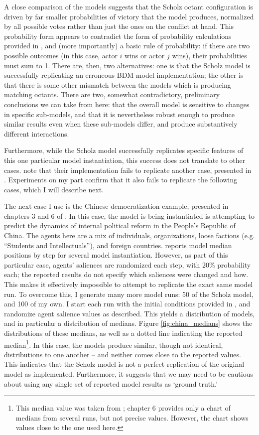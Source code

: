A close comparison of the models suggests that the Scholz octant configuration is driven by far smaller probabilities of victory that the model produces, normalized by all possible votes rather than just the ones on the conflict at hand. This probability form appears to contradict the form of probability calculations provided in \citet{bdm_1997,bdm_2002}, and (more importantly) a basic rule of probability: if there are two possible outcomes (in this case, actor $i$ wins or actor $j$ wins), their probabilities must sum to 1. There are, then, two alternatives: one is that the Scholz model is successfully replicating an erroneous BDM model implementation; the other is that there is some other mismatch between the models which is producing matching octants. There are two, somewhat contradictory, preliminary conclusions we can take from here: that the overall model is sensitive to changes in specific sub-models, and that it is nevertheless robust enough to produce similar results even when these sub-models differ, and produce substantively different interactions.

Furthermore, while the Scholz model successfully replicates specific features of this one particular model instantiation, this success does not translate to other cases. \citet{scholz_2011} note that their implementation fails to replicate another case, presented in \citet{bdm_1997}. Experiments on my part confirm that it also fails to replicate the following cases, which I will describe next.

The next case I use is the Chinese democratization example, presented in chapters 3 and 6 of \citet{bdm_2002}. In this case, the model is being instantiated is attempting to predict the dynamics of internal political reform in the People's Republic of China. The agents here are a mix of individuals, organizations, loose factions (e.g. ``Students and Intellectuals''), and foreign countries. \citet{bdm_2002} reports model median positions by step for several model instantiation. However, as part of this particular case, agents' saliences are randomized each step, with 20\% probability each; the reported results do not specify which saliences were changed and how. This makes it effectively impossible to attempt to replicate the exact same model run. To overcome this, I generate many more model runs: 50 of the Scholz model, and 100 of my own. I start each run with the initial conditions provided in \citet{bdm_2002}, and randomize agent salience values as described. This yields a distribution of models, and in particular a distribution of medians. Figure \ref{fig:china_medians} shows the distributions of these medians, as well as a dotted line indicating the reported median\footnote{This median value was taken from \citet[chapter 3]{bdm_2002}; chapter 6 provides only a chart of medians from several runs, but not precise values. However, the chart shows values close to the one used here.}. In this case, the models produce similar, though not identical, distributions to one another -- and neither comes close to the reported values. This indicates that the Scholz model is not a perfect replication of the original model as implemented. Furthermore, it suggests that we may need to be cautious about using any single set of reported model results as `ground truth.'

